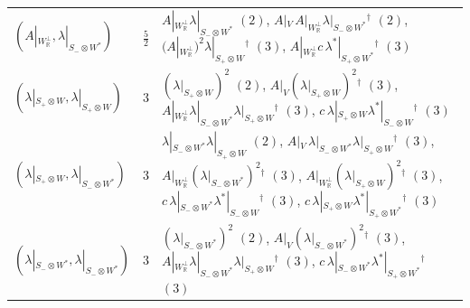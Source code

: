 \begin{tabular}{l|c|l}
$(A|_{W_{\mathbb R}^\perp},\lambda|_{S_-\otimes W^*})$ & $\tfrac52$ & $A|_{W_{\mathbb R}^\perp}\lambda|_{S_-\otimes W^*}$ $(2)$, $A|_V\,A|_{W_{\mathbb R}^\perp}\lambda|_{S_-\otimes W^*}{}^\dagger$ $(2)$, $(A|_{W_{\mathbb R}^\perp})^2\lambda|_{S_+\otimes W}{}^\dagger$ $(3)$, $A|_{W_{\mathbb R}^\perp}c\,\lambda^*|_{S_+\otimes W^*}{}^\dagger$ $(3)$\\
$(\lambda|_{S_+\otimes W},\lambda|_{S_+\otimes W})$ & $3$ & $(\lambda|_{S_+\otimes W})^2$ $(2)$, $A|_V(\lambda|_{S_+\otimes W})^2{}^\dagger$ $(3)$, $A|_{W_{\mathbb R}^\perp}\lambda|_{S_-\otimes W^*}\lambda|_{S_+\otimes W}{}^\dagger$ $(3)$, $c\,\lambda|_{S_+\otimes W}\lambda^*|_{S_-\otimes W}{}^\dagger$ $(3)$\\
$(\lambda|_{S_+\otimes W},\lambda|_{S_-\otimes W^*})$ & $3$ & $\lambda|_{S_-\otimes W^*}\lambda|_{S_+\otimes W}$ $(2)$, $A|_V\,\lambda|_{S_-\otimes W^*}\lambda|_{S_+\otimes W}{}^\dagger$ $(3)$, $A|_{W_{\mathbb R}^\perp}(\lambda|_{S_-\otimes W^*})^2{}^\dagger$ $(3)$, $A|_{W_{\mathbb R}^\perp}(\lambda|_{S_+\otimes W})^2{}^\dagger$ $(3)$, $c\,\lambda|_{S_-\otimes W^*}\lambda^*|_{S_-\otimes W}{}^\dagger$ $(3)$, $c\,\lambda|_{S_+\otimes W}\lambda^*|_{S_+\otimes W^*}{}^\dagger$ $(3)$\\
$(\lambda|_{S_-\otimes W^*},\lambda|_{S_-\otimes W^*})$ & $3$ & $(\lambda|_{S_-\otimes W^*})^2$ $(2)$, $A|_V(\lambda|_{S_-\otimes W^*})^2{}^\dagger$ $(3)$, $A|_{W_{\mathbb R}^\perp}\lambda|_{S_-\otimes W^*}\lambda|_{S_+\otimes W}{}^\dagger$ $(3)$, $c\,\lambda|_{S_-\otimes W^*}\lambda^*|_{S_+\otimes W^*}{}^\dagger$ $(3)$\\
\end{tabular}

